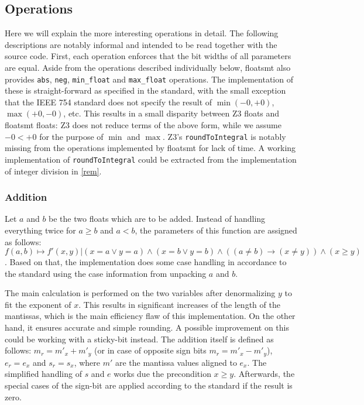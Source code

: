\documentclass[a4paper,UKenglish,cleveref, autoref, thm-restate]{lipics-v2019}
\begin{document}
\subsection{Operations}
Here we will explain the more interesting operations in detail. The following descriptions are notably informal and intended to be read together with the source code. First, each operation enforces that the bit widths of all parameters are equal. Aside from the operations described individually below, floatsmt also provides \verb|abs|, \verb|neg|, \verb|min_float| and \verb|max_float| operations. The implementation of these is straight-forward as specified in the standard, with the small exception that the IEEE 754 standard does not specify the result of $\min(-0, +0)$, $\max(+0, -0)$, etc. This results in a small disparity between Z3 floats and floatsmt floats: Z3 does not reduce terms of the above form, while we assume $-0 < +0$ for the purpose of $\min$ and $\max$. Z3's \verb|roundToIntegral| is notably missing from the operations implemented by floatsmt for lack of time. A working implementation of \verb|roundToIntegral| could be extracted from the implementation of integer division in \cref{rem}.

\subsubsection{Addition}
Let $a$ and $b$ be the two floats which are to be added. Instead of handling everything twice for $a\geq b$ and $a<b$, the parameters of this function are assigned as follows: $f(a, b) \mapsto f'(x, y) | (x = a \vee y = a) \wedge (x = b \vee y = b) \wedge ((a \neq b) \rightarrow (x \neq y)) \wedge (x \geq y)$. Based on that, the implementation does some case handling in accordance to the standard using the case information from unpacking $a$ and $b$.

The main calculation is performed on the two variables after denormalizing $y$ to fit the exponent of $x$. This results in significant increases of the length of the mantissas, which is the main efficiency flaw of this implementation. On the other hand, it ensures accurate and simple rounding. A possible improvement on this could be working with a sticky-bit instead. The addition itself is defined as follows: $m_r = m'_x + m'_y$ (or in case of opposite sign bits $m_r = m'_x - m'_y$), $e_r = e_x$ and $s_r = s_x$, where $m'$ are the mantissa values aligned to $e_x$. The simplified handling of $s$ and $e$ works due the 
precondition $x \geq y$. Afterwards, the special cases of the sign-bit are applied according to the standard if the result is zero.
\end{document}
